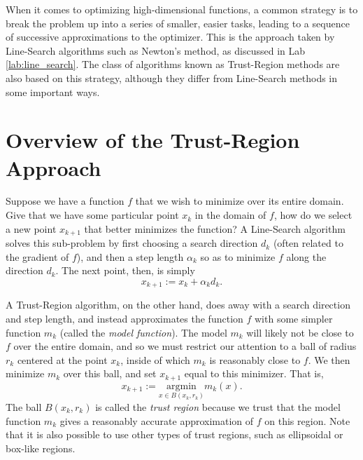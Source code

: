 \label{lab:trust_region}


When it comes to optimizing high-dimensional functions, a common strategy is to break
the problem up into a series of smaller, easier tasks, leading to a sequence of
successive approximations to the optimizer. This is the approach taken by Line-Search
algorithms such as Newton's method, as discussed in Lab \ref{lab:line_search}.
The class of algorithms known as Trust-Region methods are also based on this
strategy, although they differ from Line-Search methods in some important ways.

\section*{Overview of the Trust-Region Approach}
Suppose we have a function $f$ that we wish to minimize over its entire domain.
Give that we have some particular point $x_k$ in the domain of $f$, how do we
select a new point $x_{k+1}$ that better minimizes the function? A Line-Search
algorithm solves this sub-problem by first choosing a search direction $d_k$ 
(often related to the gradient of $f$), and then a step length $\alpha_k$ so
as to minimize $f$ along the direction $d_k$. The next point, then, is simply
\[
x_{k+1} := x_k + \alpha_k d_k.
\]

A Trust-Region algorithm, on the other hand, does away with a search direction and 
step length, and instead approximates the function $f$ with some simpler function
$m_k$ (called the \emph{model function}). The model $m_k$ will likely not be close to $f$ over the entire
domain, and so we must restrict our attention to a ball of radius $r_k$ centered at
the point $x_k$, inside of which $m_k$ is reasonably close to $f$. We then minimize
$m_k$ over this ball, and set $x_{k+1}$ equal to this minimizer. That is,
\[
x_{k+1} := \underset{x \in B(x_k, r_k)}{\text{argmin}} m_k(x).
\]
The ball $B(x_k, r_k)$ is called the \emph{trust region} because we trust that the
model function $m_k$ gives a reasonably accurate approximation of $f$ on this region.
Note that it is also possible to use other types of trust regions, such as 
ellipsoidal or box-like regions. 

